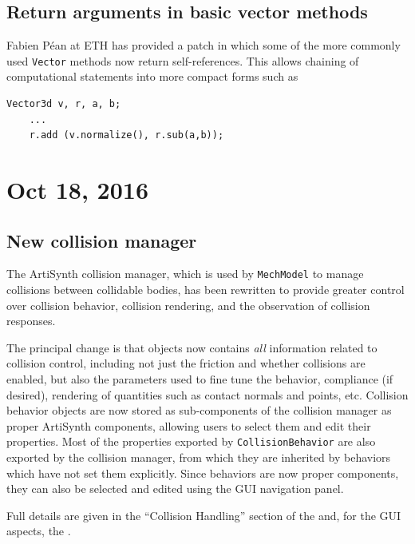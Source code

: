 \documentclass{article}
\begin{document}
\subsection*{Return arguments in basic vector methods}

Fabien P\'{e}an at ETH has provided a patch in which some of the more
commonly used {\tt Vector} methods now return self-references.  This
allows chaining of computational statements into more compact forms
such as

%
\begin{lstlisting}[]
    Vector3d v, r, a, b;
    ...
    r.add (v.normalize(), r.sub(a,b));
\end{lstlisting}
%

\section*{Oct 18, 2016}

\subsection*{New collision manager}

The ArtiSynth collision manager, which is used by {\tt MechModel} to
manage collisions between collidable bodies, has been rewritten to
provide greater control over collision behavior, collision rendering,
and the observation of collision responses. 

The principal change is that
 objects now
contains {\it all} information related to collision control, including
not just the friction and whether collisions are enabled, but also the
parameters used to fine tune the behavior, compliance (if desired),
rendering of quantities such as contact normals and points,
etc. Collision behavior objects are now stored as sub-components of
the collision manager as proper ArtiSynth components, allowing users
to select them and edit their properties. Most of the properties
exported by {\tt CollisionBehavior} are also exported by the collision
manager, from which they are inherited by behaviors which have not set
them explicitly. Since behaviors are now proper components, they can
also be selected and edited using the GUI navigation panel.

Full details are given in the ``Collision Handling'' section of the
and, for the GUI aspects, the
.
\end{document}
